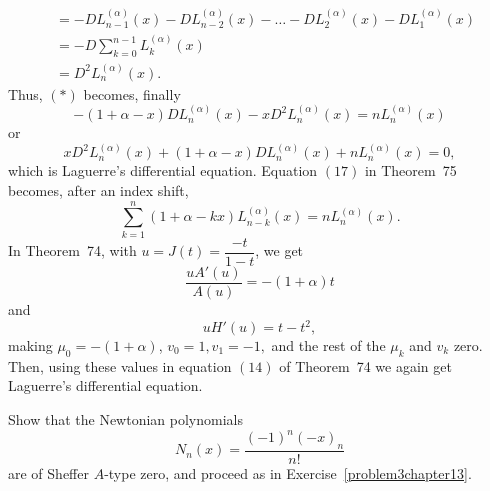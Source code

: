 \begin{solution}
$$\begin{array}{ll}
&= -D L_{n-1}^{(\alpha)}(x) - DL_{n-2}^{(\alpha)}(x) - \ldots - DL_2^{(\alpha)}(x) - DL_1^{(\alpha)}(x) \\
&=-D\displaystyle\sum_{k=0}^{n-1} L_k^{(\alpha)}(x) \\
&= D^2 L_n^{(\alpha)}(x).
\end{array}$$
Thus, $(*)$ becomes, finally
$$-(1+\alpha-x)DL_n^{(\alpha)}(x) - xD^2 L_n^{(\alpha)}(x) = nL_n^{(\alpha)}(x)$$
or
$$xD^2 L_n^{(\alpha)}(x) + (1+\alpha-x) D L_n^{(\alpha)}(x) + nL_n^{(\alpha)}(x)=0,$$
which is Laguerre's differential equation. Equation $(17)$ in Theorem~75 becomes, after an index shift,
$$\displaystyle\sum_{k=1}^n (1+\alpha-kx)L_{n-k}^{(\alpha)}(x) = nL_n^{(\alpha)}(x).$$
In Theorem~74, with $u=J(t)=\dfrac{-t}{1-t}$, we get
$$\dfrac{uA'(u)}{A(u)} = -(1+\alpha)t$$
and
$$uH'(u)=t-t^2,$$
making $\mu_0=-(1+\alpha)$, $v_0=1, v_1=-1,$ and the rest of the $\mu_k$ and $v_k$ zero. Then, using these values in equation $(14)$ of Theorem~74 we again get Laguerre's differential equation.
\end{solution}
\begin{problem}\label{problem5chapter13}
Show that the Newtonian polynomials
$$N_n(x) = \dfrac{(-1)^n (-x)_n}{n!}$$
are of Sheffer $A$-type zero, and proceed as in Exercise~\ref{problem3chapter13}.
\end{problem}

